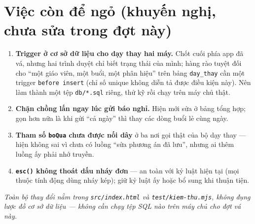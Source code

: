 \documentclass[12pt,a4paper]{article}
\newcommand{\muc}[1]{\textbf{#1}}
\begin{document}
\section{Việc còn để ngỏ (khuyến nghị, chưa sửa trong đợt này)}\label{sec:dengo}
\begin{enumerate}[leftmargin=1.6em,itemsep=2pt]
  \item \muc{Trigger ở cơ sở dữ liệu cho dạy thay hai máy.} Chốt cuối phía app đã
    vá, nhưng hai trình duyệt chỉ biết trạng thái của mình; hàng rào tuyệt đối
    cho ``một giáo viên, một buổi, một phân hiệu'' trên bảng \texttt{day\_thay}
    cần một trigger \texttt{before insert} (chỉ số unique không diễn tả được
    điều kiện này). Nên làm thành một tệp \texttt{db/*.sql} riêng, thử kỹ rồi
    chạy trên máy chủ thật.
  \item \muc{Chặn chồng lấn ngay lúc gửi báo nghỉ.} Hiện mới sửa ở bảng tổng hợp;
    gọn hơn nữa là khi gửi ``cả ngày'' thì thay các dòng buổi lẻ cùng ngày.
  \item \muc{Tham số \texttt{boQua} chưa được nối dây} ở ba nơi gọi thật của bộ
    dạy thay --- hiện không sai vì chưa có luồng ``sửa phương án đã lưu'', nhưng
    ai thêm luồng ấy phải nhớ truyền.
  \item \muc{\texttt{esc()} không thoát dấu nháy đơn} --- an toàn với kỷ luật hiện
    tại (mọi thuộc tính động dùng nháy kép); giữ kỷ luật ấy hoặc bổ sung khi
    thuận tiện.
\end{enumerate}

\bigskip
\noindent\textit{Toàn bộ thay đổi nằm trong \texttt{src/index.html} và
\texttt{test/kiem-thu.mjs}, không đụng lược đồ cơ sở dữ liệu --- không cần chạy
tệp SQL nào trên máy chủ cho đợt vá này.}
\end{document}
